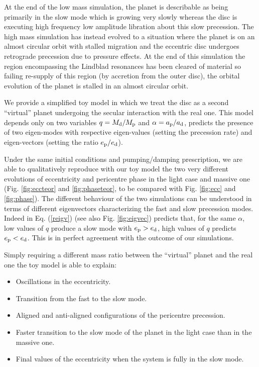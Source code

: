\documentclass[usenatbib,a4paper,times,fleqn]{mnras}
\begin{document}
At the end of the low mass simulation, the planet is describable as being primarily in the slow mode which is growing very slowly whereas the disc is executing high frequency low amplitude libration about this slow precession. The high mass simulation has instead evolved to a situation where the planet is on an almost circular orbit with stalled migration and the eccentric disc undergoes retrograde precession due to pressure effects. At the end of this simulation the region encompassing the Lindblad resonances has been cleared of material so failing re-supply of this region (by accretion from the outer disc), the orbital evolution of the planet is stalled in an almost circular orbit.  

We provide a simplified toy model in which we treat the disc as a second ``virtual'' planet undergoing the secular interaction with the real one. This model depends only on two variables $q=M_{\rm d}/M_{\rm p}$ and $\alpha=a_{\rm p}/a_{\rm d}$, predicts the presence of two eigen-modes with respective eigen-values (setting the precession rate) and eigen-vectors (setting the ratio $e_{\rm p}/e_{\rm d}$).

Under the same initial conditions and pumping/damping prescription, we are able to qualitatively reproduce with our toy model the two very different evolutions of eccentricity and pericentre phase in the light case and massive one (Fig. \ref{fig:eccteor} and \ref{fig:phaseteor}, to be compared with Fig. \ref{fig:ecc} and \ref{fig:phase}). The different behaviour of the two simulations can be understood in terms of different eigenvectors characterizing the fast and slow precession modes. Indeed in Eq. (\ref{reigv}) (see also Fig. \ref{fig:eigvec}) predicts that, for the same $\alpha$, low values of $q$ produce a slow mode with $e_{\rm p}>e_{\rm d}$, high values of $q$ predicts $e_{\rm p}<e_{\rm d}$. This is in perfect agreement with the outcome of our simulations.

Simply requiring a different mass ratio between the ``virtual'' planet and the real one the toy model is able to explain:
\begin{itemize} 
\item Oscillations in the eccentricity.
\item Transition from the fast to the slow mode.
\item Aligned and anti-aligned configurations of the pericentre precession.
\item Faster transition to the slow mode of the planet in the light case than in the massive one.
\item Final values of the eccentricity when the system is fully in the slow mode.
\end{itemize}
\end{document}

